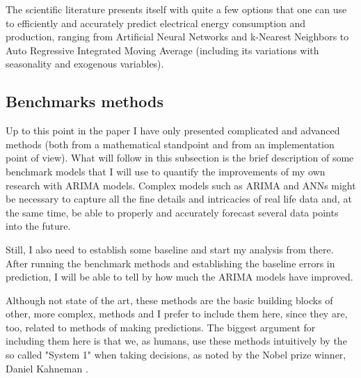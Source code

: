 \documentclass[12pt,a4paper,titlepage]{report}
\begin{document}
The scientific literature presents itself with quite a few options that one can use to efficiently and accurately predict electrical energy consumption and production, ranging from Artificial Neural Networks and k-Nearest Neighbors to Auto Regressive Integrated Moving Average (including its variations with seasonality and exogenous variables).

\subsection{Benchmarks methods}
Up to this point in the paper I have only presented complicated and advanced methods (both from a mathematical standpoint and from an implementation point of view). What will follow in this subsection is the brief description of some benchmark models that I will use to quantify the improvements of my own research with ARIMA models.
Complex models such as ARIMA and ANNs might be necessary to capture all the fine details and intricacies of real life data and, at the same time, be able to properly and accurately forecast several data points into the future.

Still, I also need to establish some baseline and start my analysis from there. After running the benchmark methods and establishing the baseline errors in prediction, I will be able to tell by how much the ARIMA models have improved.

Although not state of the art, these methods are the basic building blocks of other, more complex, methods and I prefer to include them here, since they are, too, related to methods of making predictions. The biggest argument for including them here is that we, as humans, use these methods intuitively by the so called "System 1" when taking decisions, as noted by the Nobel prize winner, Daniel Kahneman \cite{kahneman2011thinking}.
\end{document}
